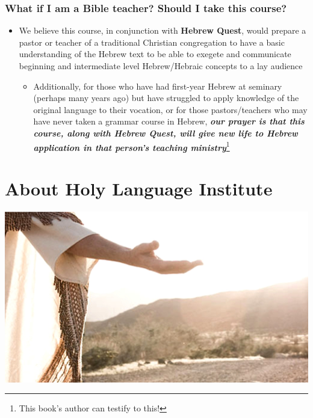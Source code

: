\documentclass[
]{turabian-researchpaper}
\providecommand{\tightlist}{%
  \setlength{\itemsep}{0pt}\setlength{\parskip}{0pt}}
\begin{document}
\hypertarget{what-if-i-am-a-bible-teacher-should-i-take-this-course}{%
\subsubsection*{What if I am a Bible teacher? Should I take this course?}\label{what-if-i-am-a-bible-teacher-should-i-take-this-course}}

\begin{itemize}
\tightlist
\item
  We believe this course, in conjunction with \textbf{Hebrew Quest}, would prepare a pastor or teacher of a traditional Christian congregation to have a basic understanding of the Hebrew text to be able to exegete and communicate beginning and intermediate level Hebrew/Hebraic concepts to a lay audience

  \begin{itemize}
  \tightlist
  \item
    Additionally, for those who have had first-year Hebrew at seminary (perhaps many years ago) but have struggled to apply knowledge of the original language to their vocation, or for those pastors/teachers who may have never taken a grammar course in Hebrew, \textbf{\emph{our prayer is that this course, along with Hebrew Quest, will give new life to Hebrew application in that person's teaching ministry}}\footnote{This book's author can testify to this!}
  \end{itemize}
\end{itemize}

\hypertarget{about-holy-language-institute}{%
\section*{About Holy Language Institute}\label{about-holy-language-institute}}

\begin{center}\includegraphics[width=500pt]{images/following_yeshua} \end{center}
\end{document}
